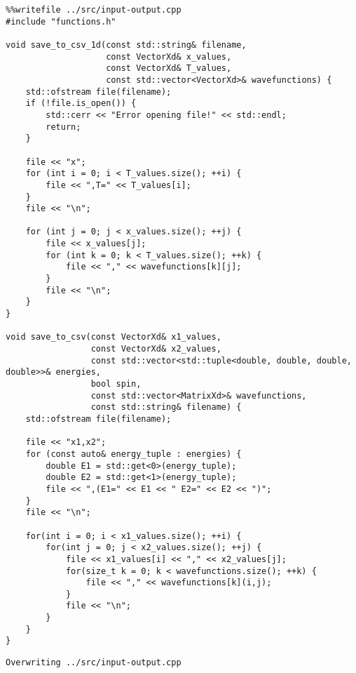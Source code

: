 \documentclass[11pt]{article}
\begin{document}
\begin{verbatim}
%%writefile ../src/input-output.cpp
#include "functions.h"

void save_to_csv_1d(const std::string& filename,
                    const VectorXd& x_values,
                    const VectorXd& T_values,
                    const std::vector<VectorXd>& wavefunctions) {
    std::ofstream file(filename);
    if (!file.is_open()) {
        std::cerr << "Error opening file!" << std::endl;
        return;
    }

    file << "x";
    for (int i = 0; i < T_values.size(); ++i) {
        file << ",T=" << T_values[i];
    }
    file << "\n";

    for (int j = 0; j < x_values.size(); ++j) {
        file << x_values[j];
        for (int k = 0; k < T_values.size(); ++k) {
            file << "," << wavefunctions[k][j];
        }
        file << "\n";
    }
}

void save_to_csv(const VectorXd& x1_values,
                 const VectorXd& x2_values,
                 const std::vector<std::tuple<double, double, double, double>>& energies,
                 bool spin,
                 const std::vector<MatrixXd>& wavefunctions,
                 const std::string& filename) {
    std::ofstream file(filename);

    file << "x1,x2";
    for (const auto& energy_tuple : energies) {
        double E1 = std::get<0>(energy_tuple);
        double E2 = std::get<1>(energy_tuple);
        file << ",(E1=" << E1 << " E2=" << E2 << ")";
    }
    file << "\n";

    for(int i = 0; i < x1_values.size(); ++i) {
        for(int j = 0; j < x2_values.size(); ++j) {
            file << x1_values[i] << "," << x2_values[j];
            for(size_t k = 0; k < wavefunctions.size(); ++k) {
                file << "," << wavefunctions[k](i,j);
            }
            file << "\n";
        }
    }
}
\end{verbatim}

\label{org7ade67c}
\begin{verbatim}
Overwriting ../src/input-output.cpp
\end{verbatim}
\end{document}

